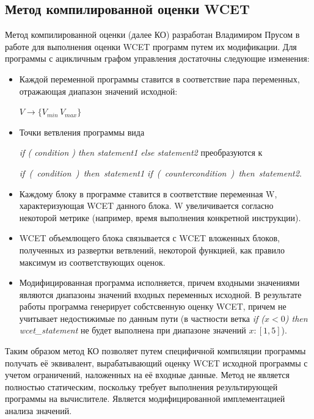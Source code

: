 \documentclass[12pt,a4paper]{article}
\begin{document}
\subsection{Метод компилированной оценки WCET}
Метод компилированной оценки (далее КО) разработан Владимиром Прусом в работе \cite{prus} для выполнения оценки WCET программ путем их модификации. Для программы с ацикличным графом управления достаточны следующие изменения:

\begin{itemize}
\item Каждой переменной программы ставится в соответствие пара переменных, отражающая диапазон значений исходной:

$V\to \{V_{min}\,V_{max}\}$

\item Точки ветвления программы вида

{\slshape if ( condition ) then statement1 else statement2} преобразуются к

{\slshape if~(~condition~)~then~statement1 if~(~countercondition~)~then~statement2}.

\item Каждому блоку в программе ставится в соответствие переменная W, характеризующая WCET данного блока. W увеличивается согласно некоторой метрике (например, время выполнения конкретной инструкции).

\item WCET объемлющего блока связывается с WCET вложенных блоков, полученных из развертки ветвлений, некоторой функцией, как правило максимум из соответствующих оценок.

\item Модифицированная программа исполняется, причем входными значениями являются диапазоны значений входных переменных исходной. В результате работы программа генерирует собстсвенную оценку WCET, причем не учитывает недостижимые по данным пути (в частности ветка {\slshape if ($x< 0$) then wcet\_statement} не будет выполнена при диапазоне значений $x:[1,5]$).

\end{itemize}

Таким образом метод КО позволяет путем специфичной компиляции программы получать её эквивалент, вырабатывающий оценку WCET исходной программы с учетом ограничений, наложенных на её входные данные. Метод не является полностью статическим, поскольку требует выполнения результирующей программы на вычислителе. Является модифицированной имплементацией анализа значений.
\end{document}
